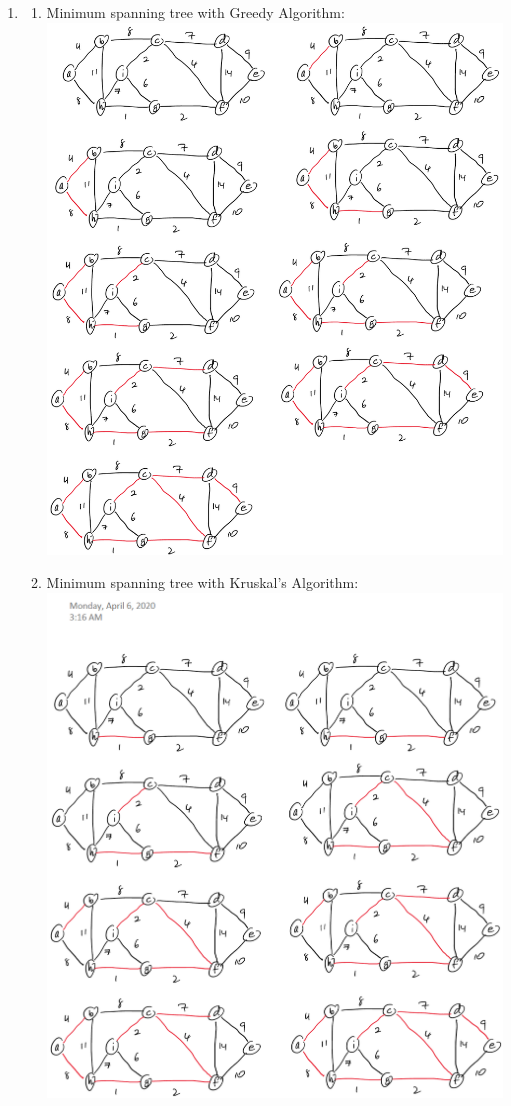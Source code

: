 \documentclass[11pt,fleqn]{article}
\begin{document}
\begin{enumerate}
	\item 
	\begin{enumerate}
		\item Minimum spanning tree with Greedy Algorithm: \\
\includegraphics[scale=0.75]{Q9a}

\newpage

		\item Minimum spanning tree with Kruskal’s Algorithm: \\
\includegraphics[scale=0.75]{Q9b}


\end{enumerate}
\end{enumerate}
\end{document}

